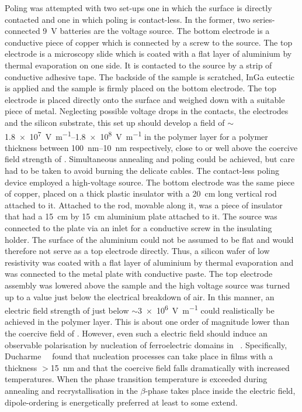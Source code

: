 Poling was attempted with two set-ups one in which the \pvdf{} surface is directly contacted and one in which poling is contact-less. In the former, two series-connected \SI{9}{\volt} batteries are the voltage source. The bottom electrode is a conductive piece of copper which is connected by a screw to the source. The top electrode is a microscopy slide which is coated with a flat layer of aluminium by thermal evaporation on one side. It is contacted to the source by a strip of conductive adhesive tape. The backside of the sample is scratched, InGa eutectic is applied and the sample is firmly placed on the bottom electrode. The top electrode is placed directly onto the \pvdf{} surface and weighed down with a suitable piece of metal. Neglecting possible voltage drops in the contacts, the electrodes and the silicon substrate, this set up should develop a field of $\sim$\SIrange{1.8e7}{1.8e8}{\volt\per\metre} in the polymer layer for a polymer thickness between \SIrange{100}{10}{\nano\metre} respectively, close to or well above the coercive field strength of \pvtr{}. Simultaneous annealing and poling could be achieved, but care had to be taken to avoid burning the delicate cables. The contact-less poling device employed a high-voltage source. The bottom electrode was the same piece of copper, placed on a thick plastic insulator with a \SI{20}{\centi\metre} long vertical rod attached to it. Attached to the rod, movable along it, was a piece of insulator that had a \SI{15}{\centi\metre} by \SI{15}{\centi\metre} aluminium plate attached to it. The source was connected to the plate via an inlet for a conductive screw in the insulating holder. The surface of the aluminium could not be assumed to be flat and would therefore not serve as a top electrode directly. Thus, a silicon wafer of low resistivity was coated with a flat layer of aluminium by thermal evaporation and was connected to the metal plate with conductive paste. The top electrode assembly was lowered above the sample and the high voltage source was turned up to a value just below the electrical breakdown of air. In this manner, an electric field strength of just below $\sim$\SI{3e6}{\volt\per\metre} could realistically be achieved in the polymer layer. This is about one order of magnitude lower than the coercive field of \pvtr{}. However, even such a  electric field should induce an observable polarisation by nucleation of ferroelectric domains in \pvdf{}~\cite[pp. 812 ff.]{encyclopedia}. Specifically, Ducharme~\etal{}~\cite{ducharme_finitesize} found that nucleation processes can take place in films with a thickness $>$\SI{15}{\nano\metre} and that the coercive field falls dramatically with increased temperatures. When the phase transition temperature is exceeded during annealing and recrystallisation in the $\beta$-phase takes place inside the electric field, dipole-ordering is energetically preferred at least to some extend.\\
